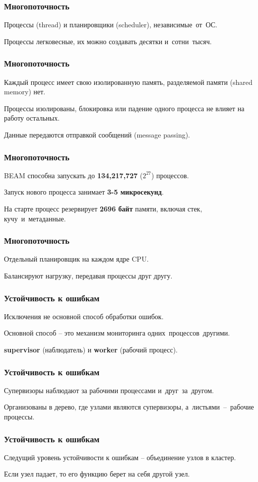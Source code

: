 \documentclass[10pt]{beamer}
\begin{document}
\begin{frame}
  \frametitle{Многопоточность}
  Процессы (thread) и планировщики (scheduler), независимые~от~ОС.
  \par \bigskip
  Процессы легковесные, их можно создавать десятки и~сотни~тысяч.
  \par \bigskip
\end{frame}
  
\begin{frame}
  \frametitle{Многопоточность}
  Каждый процесс имеет свою изолированную память, разделяемой памяти (shared memory) нет.
  \par \bigskip
  Процессы изолированы, блокировка или падение одного процесса не влияет на работу остальных.
  \par \bigskip
  Данные передаются отправкой сообщений (message passing).
\end{frame}

\begin{frame}
  \frametitle{Многопоточность}
  BEAM способна запускать до \textbf{134,217,727} ($2^{27}$) процессов.
  \par \bigskip
  Запуск нового процесса занимает \textbf{3-5 микросекунд}.
  \par \bigskip
  На старте процесс резервирует \textbf{2696 байт} памяти, включая стек, кучу~и~метаданные.
\end{frame}


\begin{frame}
  \frametitle{Многопоточность}
  Отдельный планировщик на каждом ядре CPU.
  \par \bigskip
  Балансируют нагрузку, передавая процессы друг другу.
\end{frame}

\begin{frame}
  \frametitle{Устойчивость к ошибкам}
  Исключения не основной способ обработки ошибок.
  \par \bigskip
  Основной способ -- это механизм мониторинга одних~процессов~другими.
  \par \bigskip
  \textbf{supervisor} (наблюдатель) и \textbf{worker} (рабочий процесс).
\end{frame}

\begin{frame}
  \frametitle{Устойчивость к ошибкам}
  Супервизоры наблюдают за рабочими процессами и~друг~за~другом.
  \par \bigskip
  Организованы в дерево, где узлами являются супервизоры, а~листьями~–~рабочие процессы.
\end{frame}

\begin{frame}
  \frametitle{Устойчивость к ошибкам}
  Следущий уровень устойчивости к ошибкам -- объединение узлов в кластер.
  \par \bigskip
  Если узел падает, то его функцию берет на себя другой узел.
\end{frame}



\end{document}
